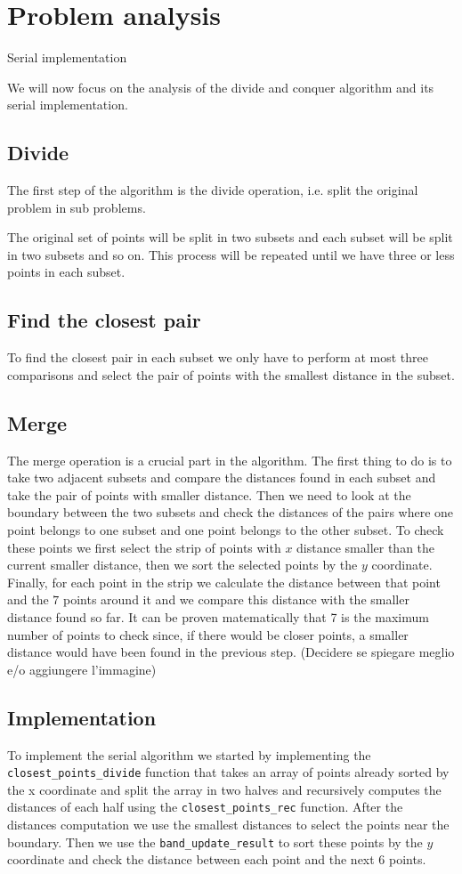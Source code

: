 \section{Problem analysis}
\label{sec:problem_analysis}

Serial implementation

We will now focus on the analysis of the divide and conquer algorithm
and its serial implementation.

\subsection{Divide}
The first step of the algorithm is the divide operation, i.e.
split the original problem in sub problems.

The original set of points will be split in two subsets and each
subset will be split in two subsets and so on. This process will be repeated
until we have three or less points in each subset.

\subsection{Find the closest pair}
To find the closest pair in each subset we only have to perform
at most three comparisons and select the pair of points with the smallest
distance in the subset.

\subsection{Merge}
The merge operation is a crucial part in the algorithm.
The first thing to do is to take two adjacent subsets and compare the distances
found in each subset and take the pair of points with smaller distance. Then we
need to look at the boundary between the two subsets and check the distances of
the pairs where one point belongs to one subset and one point belongs to the other
subset. To check these points we first select the strip of points with $x$ distance smaller
than the current smaller distance, then we sort the selected points by the $y$ coordinate.
Finally, for each point in the strip we calculate the distance between that point and
the $7$ points around it and we compare this distance with the smaller distance found so far.
It can be proven matematically that 7 is the maximum number of points to check since, if there
would be closer points, a smaller distance would have been found in the previous step.
(Decidere se spiegare meglio e/o aggiungere l'immagine)

\subsection{Implementation}
To implement the serial algorithm we started by implementing the \verb+closest_points_divide+
function that takes an array of points already sorted by the x coordinate and split the array in two
halves and recursively computes the distances of each half using the \verb+closest_points_rec+
function. After the distances computation we use the smallest distances to select the points
near the boundary. Then we use the \verb+band_update_result+ to sort these points by the $y$ coordinate
and check the distance between each point and the next 6 points.
